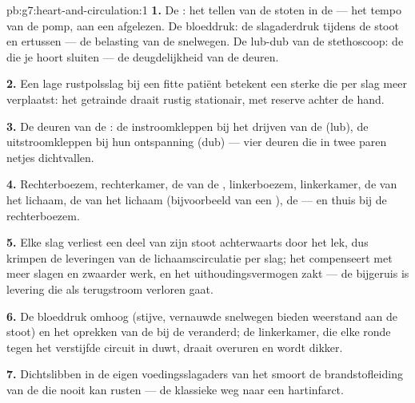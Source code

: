 \begin{solution}{pb:g7:heart-and-circulation:1}
\textbf{1.} De : het tellen van de stoten in de  --- het
tempo van de pomp, aan een  afgelezen. De bloeddruk: de slagaderdruk
tijdens de stoot en ertussen --- de belasting van de snelwegen. De lub-dub
van de stethoscoop: de  die je hoort sluiten --- de deugdelijkheid
van de deuren.

\textbf{2.} Een lage rustpolsslag bij een fitte patiënt betekent een
sterke  die per slag meer  verplaatst: het getrainde 
draait rustig stationair, met reserve achter de hand.

\textbf{3.} De deuren van de : de instroomkleppen bij het drijven
van de  (lub), de uitstroomkleppen bij hun ontspanning (dub) ---
vier deuren die in twee paren netjes dichtvallen.

\textbf{4.} Rechterboezem, rechterkamer, de  van de ,
linkerboezem, linkerkamer, de  van het lichaam, de  van
het lichaam (bijvoorbeeld van een ), de  --- en thuis bij de
rechterboezem.

\textbf{5.} Elke slag verliest een deel van zijn stoot achterwaarts door
het lek, dus krimpen de leveringen van de lichaamscirculatie per slag;
het  compenseert met meer slagen en zwaarder werk, en het
uithoudingsvermogen zakt --- de bijgeruis is levering die als
terugstroom verloren gaat.

\textbf{6.} De bloeddruk omhoog (stijve, vernauwde snelwegen bieden
weerstand aan de stoot) en het oprekken van de  bij de 
veranderd; de linkerkamer, die elke ronde tegen het verstijfde circuit in
duwt, draait overuren en wordt dikker.

\textbf{7.} Dichtslibben in de eigen voedingsslagaders van het 
smoort de brandstofleiding van de  die nooit kan rusten --- de
klassieke weg naar een hartinfarct.


\end{solution}
